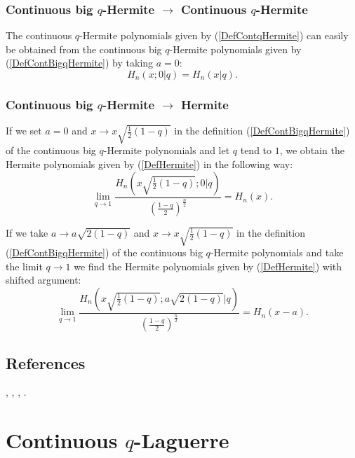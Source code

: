 \documentclass[envcountchap,graybox]{svmono}
\newcounter{rom}
\begin{document}
{{\subsubsection*{Continuous big $q$-Hermite $\rightarrow$ Continuous $q$-Hermite}
The continuous $q$-Hermite polynomials given by (\ref{DefContqHermite})
can easily be obtained from the continuous big $q$-Hermite polynomials given by
(\ref{DefContBigqHermite}) by taking $a=0$:
\begin{equation}
H_n(x;0|q)=H_n(x|q).
\end{equation}

\subsubsection*{Continuous big $q$-Hermite $\rightarrow$ Hermite}
If we set $a=0$ and $x\rightarrow x\sqrt{\frac{1}{2}(1-q)}$ in the
definition (\ref{DefContBigqHermite}) of the continuous big $q$-Hermite
polynomials and let $q$ tend to $1$, we obtain the Hermite polynomials given
by (\ref{DefHermite}) in the following way:
\begin{equation}
\lim_{q\rightarrow 1}
\frac{H_n(x\sqrt{\frac{1}{2}(1-q)};0|q)}
{\left(\frac{1-q}{2}\right)^{\frac{n}{2}}}=H_n(x).
\end{equation}

If we take $a\rightarrow a\sqrt{2(1-q)}$ and
$x\rightarrow x\sqrt{\frac{1}{2}(1-q)}$ in the definition
(\ref{DefContBigqHermite}) of the continuous big $q$-Hermite polynomials and
take the limit $q\rightarrow 1$ we find the Hermite polynomials given by
(\ref{DefHermite}) with shifted argument:
\begin{equation}
\lim_{q\rightarrow 1}
\frac{H_n(x\sqrt{\frac{1}{2}(1-q)};a\sqrt{2(1-q)}|q)}
{\left(\frac{1-q}{2}\right)^{\frac{n}{2}}}=H_n(x-a).
\end{equation}

\subsection*{References}
\cite{AskeyRahmanSuslov}, \cite{AtakAtakII}, \cite{AtakAtakIII},
\cite{Floreanini+95}.


\newpage

\section{Continuous $q$-Laguerre}
\par\setcounter{equation}{0}

}}
\end{document}

